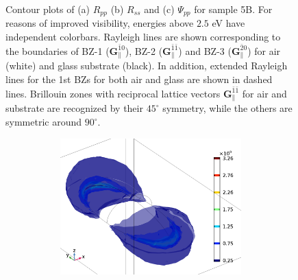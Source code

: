 \begin{figure}[h]
    \caption{Contour plots of (a) $R_{pp}$ (b) $R_{ss}$ and (c) $\Psi_{pp}$ for sample 5B. For reasons of improved visibility, energies above $2.5$ eV have independent colorbars. Rayleigh lines are shown corresponding to the boundaries of BZ-1 ($\mathbf{G}_\parallel^{\bar{1}0}$), BZ-2 ($\mathbf{G}_\parallel^{\bar{1}\bar{1}}$) and BZ-3 ($\mathbf{G}_\parallel^{\bar{2}0}$) for air (white) and glass substrate (black). In addition, extended Rayleigh lines for the 1st BZs for both air and glass are shown in dashed lines. Brillouin zones with reciprocal lattice vectors $\mathbf{G}_\parallel^{\bar{1}\bar{1}}$ for air and substrate are recognized by their $45^\circ$ symmetry, while the others are symmetric around $90^\circ$.}
    \label{fig:S5B_contour_RppRss_Psipp}
\end{figure}

\begin{figure}
    \begin{subfigure}{0.5\textwidth}
    \begin{subfigure}{\textwidth}
        \centering
        \includegraphics[width=0.9\linewidth]{figures/ch4/S5B/fielddistr/s5b_normE_TM_wl1010_phi90(2).png}
    \end{subfigure}
    

\end{subfigure}
\end{figure}
